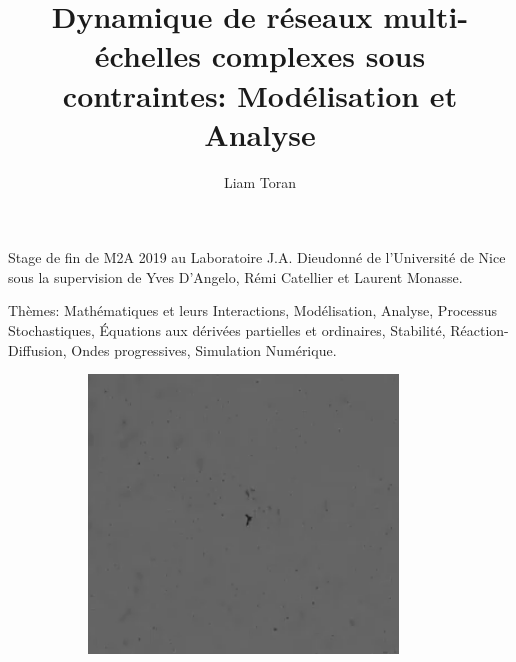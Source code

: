\documentclass[11pt]{article}
\title{\textbf{Dynamique de réseaux multi-échelles complexes sous contraintes: Modélisation et Analyse}}
\author{Liam Toran}
\date{}
\theoremstyle{definition}
\begin{document}

\maketitle
\vspace{-20px}
\begin{center}
Stage de fin de M2A 2019 au Laboratoire J.A. Dieudonné de l'Université de Nice\\ sous la supervision de Yves D'Angelo, Rémi Catellier et Laurent Monasse.
\end{center}
{\footnotesize Thèmes: Mathématiques et leurs Interactions, Modélisation, Analyse, Processus Stochastiques, Équations aux dérivées partielles et ordinaires, Stabilité, Réaction-Diffusion, Ondes progressives, Simulation Numérique.}
\begin{figure}[hb]
\begin{subfigure}[b]{0.5\textwidth}
\includegraphics[width=\textwidth]{Images/1.png}
\end{subfigure}
\begin{subfigure}[b]{0.5\textwidth}

\end{subfigure}
\end{figure}
\end{document}
